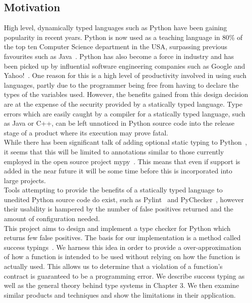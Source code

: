 \documentclass[12pt, titlepage]{article}
\begin{document}
\subsection{Motivation}
High level, dynamically typed languages such as Python have been gaining popularity in recent years. Python is now used as a teaching language in 80\% of the top ten Computer Science department in the USA, surpassing previous favourites such as Java~\cite{guoTeaching}. Python has also become a force in industry and has been picked up by influential software engineering companies such as Google and Yahoo!~\cite{organisationsPython}. One reason for this is a high level of productivity involved in using such languages, partly due to the programmer being free from having to declare the types of the variables used. However, the benefits gained from this design decision are at the expense of the security provided by a statically typed language. Type errors which are easily caught by a compiler for a statically typed language, such as Java or C++, can be left unnoticed in Python source code into the release stage of a product where its execution may prove fatal. \\ %
\indent While there has been significant talk of adding optional static typing to Python~\cite{guido1, guido2, guido3, guidoLatest}, it seems that this will be limited to annotations similar to those currently employed in the open source project mypy~\cite{mypy}. This means that even if support is added in the near future it will be some time before this is incorporated into large projects. \\
\indent Tools attempting to provide the benefits of a statically typed language to unedited Python source code do exist, such as Pylint~\cite{pylint} and PyChecker~\cite{pychecker}, however their usability is hampered by the number of false positives returned and the amount of configuration needed. \\
\indent This project aims to design and implement a type checker for Python which returns few false positives. The basis for our implementation is a method called success typings~\cite{lindhal06}. We harness this idea in order to provide a over-approximation of how a function is intended to be used without relying on how the function is actually used. This allows us to determine that a violation of a function's contract is guaranteed to be a programming error. We describe success typing as well as the general theory behind type systems in Chapter 3. We then examine similar products and techniques and show the limitations in their application. \\
\end{document}
